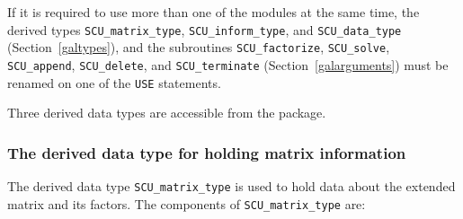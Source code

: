 \documentclass{galahad}
\newcommand{\packagename}{SCU}
\begin{document}
\noindent
If it is required to use more than one of the modules at the same time, 
the derived types
{\tt \packagename\_matrix\_type}, 
{\tt \packagename\_inform\_type}, and
{\tt \packagename\_data\_type} 
(Section~\ref{galtypes}),
and the subroutines
{\tt \packagename\_factorize},  
{\tt \packagename\_solve},  
{\tt \packagename\_append},  
{\tt \packagename\_delete}, 
and 
{\tt \packagename\_terminate} 
(Section~\ref{galarguments})
must be renamed on one of the {\tt USE} statements.





\galtypes
Three derived data types are accessible from the package.


\subsubsection{The derived data type for holding matrix information}
\label{typematrix}
The derived data type {\tt \packagename\_matrix\_type} is used to hold 
data about the extended matrix and its factors. The components of 
{\tt \packagename\_matrix\_type} 
are:
\end{document}
